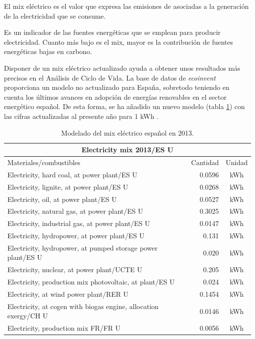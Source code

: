 El mix eléctrico es el valor que expresa las emisiones de  asociadas a la generación de la electricidad que se consume.

Es un indicador de las fuentes energéticas que se emplean para producir electricidad. Cuanto más bajo es el mix, mayor es la contribución de fuentes energéticas bajas en carbono.

Disponer de un mix eléctrico actualizado ayuda a obtener unos resultados más precisos en el Análisis de Ciclo de Vida. La base de datos de \textit{ecoinvent} proporciona un modelo no actualizado para España, sobretodo teniendo en cuenta los últimos avances en adopción de energías renovables en el sector energético español. De esta forma, se ha añadido un nuevo modelo (tabla \ref{modeladomixelectrico}) con las cifras actualizadas al presente año para 1 \si{kWh} \cite{mlgceballos}.

\begin{table}[!htb]
\centering
\begin{tabular}{p{8cm}rc}
\toprule
\multicolumn{3}{c}{Electricity mix 2013/ES U}\\
\midrule
Materiales/combustibles & Cantidad & Unidad\\
\midrule
Electricity, hard coal, at power plant/ES U & 0.0596 & \si{kWh}\\
Electricity, lignite, at power plant/ES U & 0.0268 & \si{kWh}\\
Electricity, oil, at power plant/ES U & 0.0527 & \si{kWh}\\
Electricity, natural gas, at power plant/ES U & 0.3025 & \si{kWh}\\
Electricity, industrial gas, at power plant/ES U & 0.0147 & \si{kWh}\\
Electricity, hydropower, at power plant/ES U & 0.131 & \si{kWh}\\
Electricity, hydropower, at pumped storage power plant/ES U & 0.020 & \si{kWh}\\
Electricity, nuclear, at power plant/UCTE U & 0.205 & \si{kWh}\\
Electricity, production mix photovoltaic, at plant/ES U & 0.024 & \si{kWh}\\
Electricity, at wind power plant/RER U & 0.1454 & \si{kWh}\\
Electricity, at cogen with biogas engine, allocation exergy/CH U & 0.0146 & \si{kWh}\\
Electricity, production mix FR/FR U & 0.0056 & \si{kWh}\\
\bottomrule
\end{tabular}
\caption{Modelado del mix eléctrico español en 2013.}
\label{modeladomixelectrico}
\end{table}

